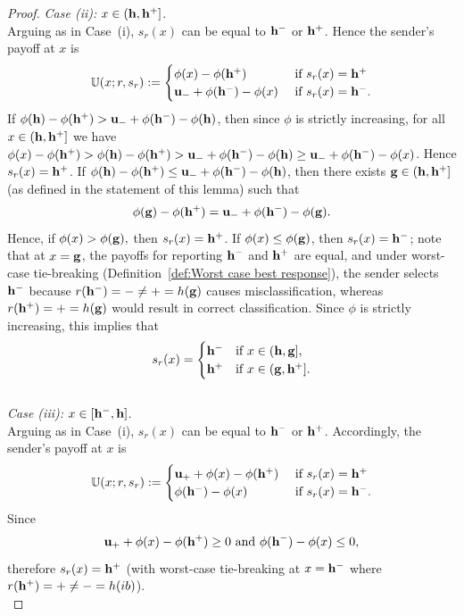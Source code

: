 \begin{proof}
\noindent \textit{Case (ii): }
		 $x \in (\mathbf{h},\mathbf{h^{+}}]$.\\ Arguing as in Case~(i), $s_r(x)$ can be equal to $\mathbf{h^{-}}$ or $\mathbf{h^{+}}$. Hence the sender's payoff at $x$ is
		\[\mathbb{U}(x;r,s_r) := \begin{cases}
			\phi(x) - \phi(\mathbf{h^{+}})  & \text{ if } s_r(x) = \mathbf{h^{+}} \\
		\mathbf{u_-} + \phi(\mathbf{h^{-}}) - \phi(x)& \text{ if } s_r(x)=\mathbf{h^{-}}.\\
		\end{cases}\]
	If $\phi(\mathbf{h}) - \phi(\mathbf{h^{+}}) > \mathbf{u_-} + \phi(\mathbf{h^{-}}) - \phi(\mathbf{h})$, then since $\phi$ is strictly increasing, for all $x \in (\mathbf{h}, \mathbf{h^{+}}]$ we have $\phi(x) - \phi(\mathbf{h^{+}}) > \phi(\mathbf{h}) - \phi(\mathbf{h^{+}}) > \mathbf{u_-} + \phi(\mathbf{h^{-}}) - \phi(\mathbf{h}) \geq \mathbf{u_-} + \phi(\mathbf{h^{-}}) - \phi(x)$. Hence $s_r(x) = \mathbf{h^{+}}$.
	If $\phi(\mathbf{h}) - \phi(\mathbf{h^{+}}) \leq \mathbf{u_-} + \phi(\mathbf{h^{-}}) - \phi(\mathbf{h})$, then there exists $\mathbf{g} \in (\mathbf{h},\mathbf{h^{+}}]$ (as defined in the statement of this lemma) such that
	\[\phi(\mathbf{g}) - \phi(\mathbf{h^{+}}) = \mathbf{u_-} + \phi(\mathbf{h^{-}}) - \phi(\mathbf{g}).\] Hence, if $\phi(x) > \phi(\mathbf{g}),$ then $s_r(x) = \mathbf{h^{+}}$. If $\phi(x) \leq \phi(\mathbf{g})$, then $s_r(x) = \mathbf{h^{-}}$; note that at $x = \mathbf{g}$, the payoffs for reporting $\mathbf{h^{-}}$ and $\mathbf{h^{+}}$ are equal, and under worst-case tie-breaking (Definition~\ref{def:Worst case best response}), the sender selects $\mathbf{h^{-}}$ because $r(\mathbf{h^{-}}) = \mathbf{-} \neq \mathbf{+} = h(\mathbf{g})$ causes misclassification, whereas $r(\mathbf{h^{+}}) = \mathbf{+} = h(\mathbf{g})$ would result in correct classification.
	Since $\phi$ is strictly increasing, this implies that
	 \[s_r(x) = \begin{cases}
	 	\mathbf{h^{-}} & \text{if } x \in (\mathbf{h},\mathbf{g}],\\
	 	\mathbf{h^{+}} & \text{if } x \in (\mathbf{g},\mathbf{h^{+}}].
	 \end{cases}\]\\


\noindent \textit{Case (iii): }
		$x \in [\mathbf{h^{-}},\mathbf{h}]$.\\ Arguing as in Case~(i), $s_r(x)$ can be equal to $\mathbf{h^{-}}$ or $\mathbf{h^{+}}$.
		Accordingly, the sender's payoff at $x$ is
		\[\mathbb{U}(x;r,s_r) := \begin{cases}
			\mathbf{u_+} + \phi(x) - \phi(\mathbf{h^{+}})  & \text{ if } s_r(x) = \mathbf{h^{+}} \\
			\phi(\mathbf{h^{-}}) - \phi(x)& \text{ if } s_r(x) = \mathbf{h^{-}}.\\
		\end{cases}\]
 Since $$\mathbf{u_+} + \phi(x) - \phi(\mathbf{h^{+}})  \geq 0 \text{ and } \phi(\mathbf{h^{-}}) - \phi(x) \leq 0,$$ therefore $s_r(x) = \mathbf{h^{+}}$ (with worst-case tie-breaking at $x = \mathbf{h^{-}}$ where $r(\mathbf{h^{+}}) = \mathbf{+} \neq \mathbf{-} = h(ib)$). \\



\end{proof}
